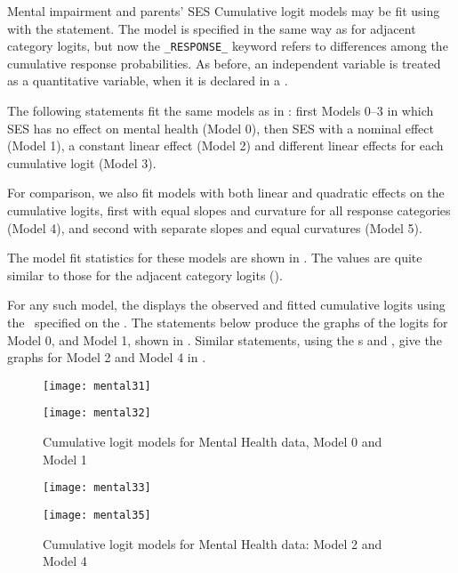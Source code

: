 \begin{Example}[mental3]{Mental impairment and parents' SES}
Cumulative logit models may be fit using  with the
 statement.
The model is specified in the same way as for adjacent category
logits, but now the \verb|_RESPONSE_| keyword refers to
differences among the cumulative response probabilities.
As before,
an independent variable is treated as a quantitative variable,
when it is declared in a .

The following statements fit
the same models as in : first Models 0--3
in which SES has no effect on mental health (Model 0), then SES with
a nominal effect (Model 1), a constant linear effect (Model 2)
and different linear effects for each cumulative logit (Model 3).


For comparison, we also fit models with both linear and quadratic
effects on the cumulative logits,
first with equal slopes and curvature
for all response categories (Model 4), and second with separate slopes and
equal curvatures (Model 5).


The model fit statistics for these models are shown in .
The values are quite similar to those for the adjacent category logits
().


For any such model, the  displays the observed and fitted
cumulative logits using the \ODS\ specified on the
.
The statements below produce the graphs of the logits for Model 0,
and Model 1,
shown in .
Similar statements, using the \ODS s  and ,
give the graphs for Model 2 and Model 4 in .


\begin{figure}[htb]
 \begin{minipage}[t]{.49\linewidth}
  \texttt{[image: mental31]}
 \end{minipage}%
 \hfill
 \begin{minipage}[t]{.49\linewidth}
  \texttt{[image: mental32]}
 \end{minipage}
 \caption{Cumulative logit models for Mental Health data, Model 0 and Model 1}\label{fig:mental3a}
\end{figure}

\begin{figure}[htb]
 \begin{minipage}[t]{.49\linewidth}
  \texttt{[image: mental33]}
 \end{minipage}%
 \hfill
 \begin{minipage}[t]{.49\linewidth}
  \texttt{[image: mental35]}
 \end{minipage}
 \caption{Cumulative logit models for Mental Health data: Model 2 and Model 4}\label{fig:mental3b}
\end{figure}
\end{Example}